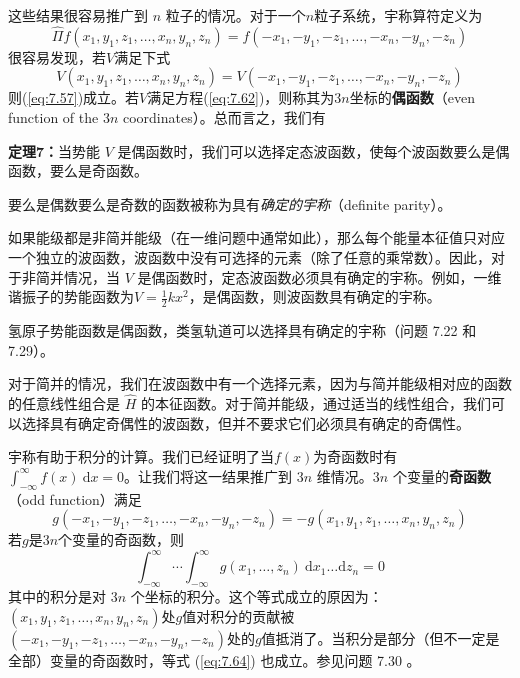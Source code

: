     这些结果很容易推广到 $n$ 粒子的情况。对于一个$n$粒子系统，宇称算符定义为
    \begin{equation}
        \hat{\Pi}f\left(x_1,y_1,z_1,\ldots,x_n,y_n,z_n\right) = f\left(-x_1,-y_1,-z_1,\ldots,-x_n,-y_n,-z_n\right)
        \label{eq:7.61}
    \end{equation}
    很容易发现，若$V$满足下式
    \begin{equation}
        V\left(x_1,y_1,z_1,\ldots,x_n,y_n,z_n\right) = V\left(-x_1,-y_1,-z_1,\ldots,-x_n,-y_n,-z_n\right)
        \label{eq:7.62}
    \end{equation}
    则(\ref{eq:7.57})成立。若$V$满足方程(\ref{eq:7.62})，则称其为$3n$坐标的\textbf{偶函数}（even function of the $3n$ coordinates）。总而言之，我们有
    \begin{center}
        \parbox{0.8\textwidth}{
            \centering
            \textbf{定理7：}当势能 $V$ 是偶函数时，我们可以选择定态波函数，使每个波函数要么是偶函数，要么是奇函数。
        }
    \end{center}

    要么是偶数要么是奇数的函数被称为具有\textit{确定的宇称}（definite parity）。

    如果能级都是非简并能级（在一维问题中通常如此），那么每个能量本征值只对应一个独立的波函数，波函数中没有可选择的元素（除了任意的乘常数）。因此，对于非简并情况，当 $V$ 是偶函数时，定态波函数必须具有确定的宇称。例如，一维谐振子的势能函数为$V = \frac{1}{2}kx^2$，是偶函数，则波函数具有确定的宇称。

    氢原子势能函数是偶函数，类氢轨道可以选择具有确定的宇称（问题 7.22 和 7.29）。

    对于简并的情况，我们在波函数中有一个选择元素，因为与简并能级相对应的函数的任意线性组合是 $\hat{H}$ 的本征函数。对于简并能级，通过适当的线性组合，我们可以选择具有确定奇偶性的波函数，但并不要求它们必须具有确定的奇偶性。

    宇称有助于积分的计算。我们已经证明了当$f\left(x\right)$为奇函数时有$\int_{-\infty}^{\infty}f\left(x\right)\:\mathrm{d}x = 0$。让我们将这一结果推广到 $3n$ 维情况。$3n$ 个变量的\textbf{奇函数}（odd function）满足
    \begin{equation}
        g\left(-x_1,-y_1,-z_1,\ldots,-x_n,-y_n,-z_n\right) = -g\left(x_1,y_1,z_1,\ldots,x_n,y_n,z_n\right)
        \label{eq:7.63}
    \end{equation}
    若$g$是$3n$个变量的奇函数，则
    \begin{equation}
        \int_{-\infty}^{\infty}\cdots\int_{-\infty}^{\infty}g\left(x_1,\ldots,z_n\right)\:\mathrm{d}x_1\ldots\mathrm{d}z_n = 0
        \label{eq:7.64}
    \end{equation}
    其中的积分是对 $3n$ 个坐标的积分。这个等式成立的原因为：$\left(x_1,y_1,z_1,\ldots,x_n,y_n,z_n\right)$处$g$值对积分的贡献被$\left(-x_1,-y_1,-z_1,\ldots,-x_n,-y_n,-z_n\right)$处的$g$值抵消了。当积分是部分（但不一定是全部）变量的奇函数时，等式 (\ref{eq:7.64}) 也成立。参见问题 7.30 。













